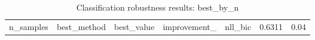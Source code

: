 \begin{table}
\caption{Classification robustness results: best_by_n}
\label{tab:classification_robustness_best_by_n}
\begin{tabular}{rllll}
\toprule
n_samples & best_method & best_value & improvement_%
 & nll_bic & 0.6311 & 0.04%
\bottomrule
\end{tabular}
\end{table}
